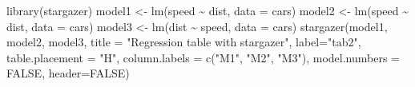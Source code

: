 \documentclass[
  12pt,
]{article}
\newenvironment{Shaded}{\begin{snugshade}}{\end{snugshade}}
\newcommand{\AttributeTok}[1]{\textcolor[rgb]{0.77,0.63,0.00}{#1}}
\newcommand{\ConstantTok}[1]{\textcolor[rgb]{0.00,0.00,0.00}{#1}}
\newcommand{\FunctionTok}[1]{\textcolor[rgb]{0.00,0.00,0.00}{#1}}
\newcommand{\NormalTok}[1]{#1}
\newcommand{\OtherTok}[1]{\textcolor[rgb]{0.56,0.35,0.01}{#1}}
\newcommand{\SpecialCharTok}[1]{\textcolor[rgb]{0.00,0.00,0.00}{#1}}
\newcommand{\StringTok}[1]{\textcolor[rgb]{0.31,0.60,0.02}{#1}}
\begin{document}
\begin{Shaded}
\begin{Highlighting}[]
\FunctionTok{library}\NormalTok{(stargazer)}
\NormalTok{model1 }\OtherTok{\textless{}{-}} \FunctionTok{lm}\NormalTok{(speed }\SpecialCharTok{\textasciitilde{}}\NormalTok{ dist, }\AttributeTok{data =}\NormalTok{ cars)}
\NormalTok{model2 }\OtherTok{\textless{}{-}} \FunctionTok{lm}\NormalTok{(speed }\SpecialCharTok{\textasciitilde{}}\NormalTok{ dist, }\AttributeTok{data =}\NormalTok{ cars)}
\NormalTok{model3 }\OtherTok{\textless{}{-}} \FunctionTok{lm}\NormalTok{(dist }\SpecialCharTok{\textasciitilde{}}\NormalTok{ speed, }\AttributeTok{data =}\NormalTok{ cars)}
\FunctionTok{stargazer}\NormalTok{(model1, model2, model3,}
          \AttributeTok{title =} \StringTok{"Regression table with stargazer"}\NormalTok{,}
          \AttributeTok{label=}\StringTok{"tab2"}\NormalTok{,}
          \AttributeTok{table.placement =} \StringTok{"H"}\NormalTok{,}
          \AttributeTok{column.labels =} \FunctionTok{c}\NormalTok{(}\StringTok{"M1"}\NormalTok{, }\StringTok{"M2"}\NormalTok{, }\StringTok{"M3"}\NormalTok{),}
          \AttributeTok{model.numbers =} \ConstantTok{FALSE}\NormalTok{,}
          \AttributeTok{header=}\ConstantTok{FALSE}\NormalTok{)}
\end{Highlighting}
\end{Shaded}
\end{document}
